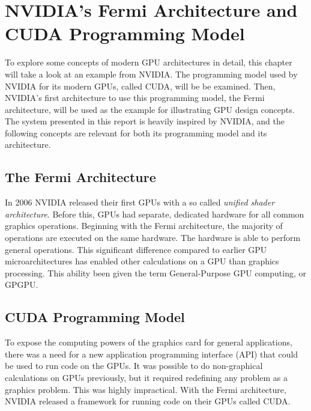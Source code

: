 \documentclass[../main/report.tex]{subfiles}
\begin{document}
\chapter{NVIDIA's Fermi Architecture and CUDA Programming Model}
\label{sec:fermi}


To explore some concepts of modern GPU architectures in detail, this chapter will take a look at an example from NVIDIA.
The programming model used by NVIDIA for its modern GPUs, called CUDA, will be be examined.
Then, NVIDIA's first architecture to use this programming model, the Fermi architecture, will be used as the example for illustrating GPU design concepts.  
The system presented in this report is heavily inspired by NVIDIA, and the following concepts are relevant for both its programming model and its architecture.


\section{The Fermi Architecture}

In 2006 NVIDIA released their first GPUs with a so called \emph{unified shader architecture}.
Before this, GPUs had separate, dedicated hardware for all common graphics operations. 
Beginning with the Fermi architecture, the majority of operations are executed on the same hardware.
The hardware is able to perform general operations.
This significant difference compared to earlier GPU microarchitectures has enabled other calculations on a GPU than graphics processing.
This ability been given the term General-Purpose GPU computing, or GPGPU.


\section{CUDA Programming Model}
\label{sec:cuda_prog_model}

To expose the computing powers of the graphics card for general applications, there was a need for a new application programming interface (API) that could be used to run code on the GPUs.
It was possible to do non-graphical calculations on GPUs previously, but it required redefining any problem as a graphics problem.
This was highly impractical. 
With the Fermi architecture, NVIDIA released a framework for running code on their GPUs called CUDA.
\end{document}
